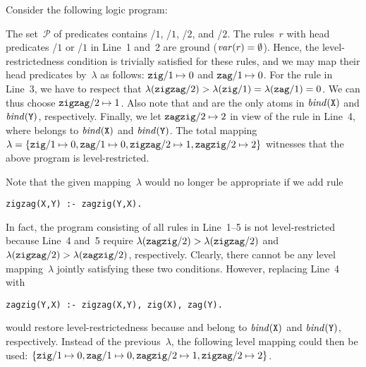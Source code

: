 \begin{example}\label{ex:lambda}
Consider the following logic program:
%

%
The set~$\mathcal{P}$ of predicates contains
/$1$, /$1$,
/$2$, and /$2$.
The rules~$r$ with head predicates /$1$ or /$1$ in Line~1 and~2
are ground ($\vars{r}=\nolinebreak\emptyset$).
Hence, the level-restrictedness condition is trivially satisfied for these rules,
and we may map their head predicates by~$\lambda$ as follows:
$\texttt{zig}/1 \mapsto 0$ and $\texttt{zag}/1 \mapsto 0$.
For the rule in Line~3,
we have to respect that
$\lambda(\pred{zigzag}/2) > \lambda(\pred{zig}/1) = \lambda(\pred{zag}/1) =\nolinebreak 0$.
We can thus choose $\texttt{zigzag}/2\mapsto 1$.
Also note that  and  are
the only atoms in $\mathit{bind}(\texttt{X})$ and $\mathit{bind}(\texttt{Y})$, respectively.
Finally, we let $\texttt{zagzig}/2\mapsto 2$ in view of the rule in Line~4,
where  belongs to
$\mathit{bind}(\texttt{X})$ and $\mathit{bind}(\texttt{Y})$.
The total mapping
\(
\lambda=
\{
\texttt{zig}/1 \mapsto 0,
\texttt{zag}/1 \mapsto 0,
\texttt{zigzag}/2\mapsto 1,
\texttt{zagzig}/2\mapsto 2
\}
\)
witnesses that the above program is level-restricted.

Note that the given mapping~$\lambda$ would no longer be appropriate
if we add rule
%
\begin{lstlisting}[firstnumber=5]
zigzag(X,Y) :- zagzig(Y,X).
\end{lstlisting}
%
In fact, the program consisting of all rules in Line~1--5 is not
level-restricted because Line~4 and~5 require
$\lambda(\texttt{zagzig}/2) > \lambda(\texttt{zigzag}/2)$ and
$\lambda(\texttt{zigzag}/2) > \lambda(\texttt{zagzig}/2)$, respectively.
Clearly, there cannot be any level mapping~$\lambda$ jointly
satisfying these two conditions.
However, replacing Line~4 with
%
\begin{lstlisting}[firstnumber=4]
zagzig(Y,X) :- zigzag(X,Y), zig(X), zag(Y).
\end{lstlisting}
%
would restore level-restrictedness because
 and  belong to
$\mathit{bind}(\texttt{X})$ and $\mathit{bind}(\texttt{Y})$, respectively.
Instead of the previous~$\lambda$, the following level mapping could then be used:
\(
\{
\texttt{zig}/1 \mapsto 0,
\texttt{zag}/1 \mapsto 0,
\texttt{zagzig}/2\mapsto 1,
\texttt{zigzag}/2\mapsto 2
\}
\).\nolinebreak
\eexample
\end{example}

